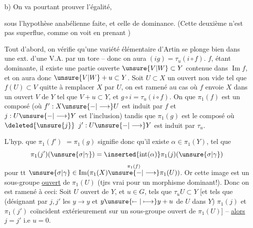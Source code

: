 b) On va pourtant prouver l'égalité,

sous l'hypothèse anabélienne faite, et celle de dominance. (Cette deuxième n'est pas superflue, comme on voit en prenant  )

Tout d'abord, on vérifie qu'une variété élémentaire d'Artin se plonge bien  dans une ext. d'une V.A. par un tore -- donc on aura $(ig)=\tau_u(i\circ f)$.    $f$, étant dominante, il existe une partie ouverte  $\unsure{V|W}\subset Y$ contenue dans $\operatorname{Im}f$, et on aura donc $\unsure{V|W}+u\subset Y$. Soit $U\subset X$ un ouvert non vide tel que $f(U)\subset V$   quitte à remplacer $X$ par $U$, on est ramené au cas où $f$ envoie $X$ dans un ouvert $V$ de $Y$ tel que $V+u\subset Y$, et $g\circ i=\tau_u(i\circ f)$. On   que $\pi_1(f)$ est un composé (où $f':X\unsure{-|\longrightarrow}U$ est  induit par $f$ et $j:U\unsure{-|\longrightarrow}Y$ est l'inclusion)
tandis que $\pi_1(g)$ est le composé
où $\deleted{\unsure{j}}$ $j':U\unsure{-|\longrightarrow}Y$ est induit par $\tau_u$.

L'hyp. que $\pi_1(f')$  $=\pi_1(g)$ signifie donc qu'il existe $\alpha\in\pi_1(Y)$, tel que
\[
\pi_1(j')(\unsure{\sigma|\gamma})=\inserted{\operatorname{int}(\alpha)}\pi_1(j)(\unsure{\sigma|\gamma})
\]
pour tt $\unsure{\sigma|\gamma}\in\operatorname{Im}(\pi_1(X)\overset{\pi_1(f)}{\unsure{-|\longrightarrow}}\pi_1(U))$. Or cette image est un sous-groupe \uline{ouvert} de $\pi_1(U)$ (tjrs vrai pour un morphisme dominant!).  Donc on est ramené à ceci: Soit $U$ ouvert \inserted{$\ne\varnothing$} de $Y$, et $u\in G$, tels que $\tau_uU\subset Y$ [et tels que (désignant par $j,j'$ les   $y\longrightarrow y$ et $y\unsure{\mapstochar\relbar|\longmapsto}y+u$ de $U$ dans $Y$) $\pi_1(j)$ et $\pi_1(j')$ coïncident extérieurement sur un sous-groupe ouvert de $\pi_1(U)$] -- \uline{alors} $j=j'$ i.e $u=0$.

